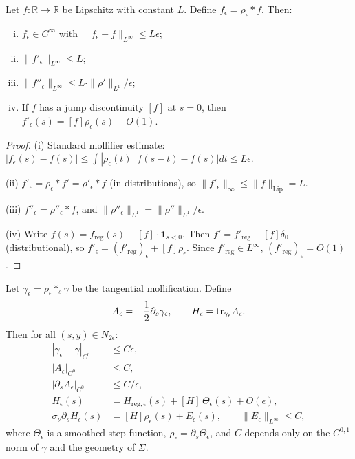 \begin{lemma}
\label{lem:MollificationLipschitz}
Let $f: \mathbb{R} \to \mathbb{R}$ be Lipschitz with constant $L$. Define $f_\epsilon = \rho_\epsilon * f$. Then:
\begin{enumerate}[(i)]
\item $f_\epsilon \in C^\infty$ with $\|f_\epsilon - f\|_{L^\infty} \le L\epsilon$;
\item $\|f'_\epsilon\|_{L^\infty} \le L$;
\item $\|f''_\epsilon\|_{L^\infty} \le L \cdot \|\rho'\|_{L^1} / \epsilon$;
\item If $f$ has a jump discontinuity $[f]$ at $s = 0$, then $f'_\epsilon(s) = [f] \rho_\epsilon(s) + O(1)$.
\end{enumerate}
\end{lemma}

\begin{proof}
(i) Standard mollifier estimate: $|f_\epsilon(s) - f(s)| \le \int |\rho_\epsilon(t)| |f(s-t) - f(s)| dt \le L\epsilon$.

(ii) $f'_\epsilon = \rho_\epsilon * f' = \rho'_\epsilon * f$ (in distributions), so $\|f'_\epsilon\|_\infty \le \|f\|_{\mathrm{Lip}} = L$.

(iii) $f''_\epsilon = \rho''_\epsilon * f$, and $\|\rho''_\epsilon\|_{L^1} = \|\rho''\|_{L^1} / \epsilon$.

(iv) Write $f(s) = f_{\mathrm{reg}}(s) + [f] \cdot \mathbf{1}_{s < 0}$. Then $f' = f'_{\mathrm{reg}} + [f] \delta_0$ (distributional), so
$f'_\epsilon = (f'_{\mathrm{reg}})_\epsilon + [f] \rho_\epsilon$. Since $f'_{\mathrm{reg}} \in L^\infty$, $(f'_{\mathrm{reg}})_\epsilon = O(1)$.
\end{proof}

\begin{proposition}
\label{prop:MollifiedGeometry}
Let $\gamma_\epsilon = \rho_\epsilon *_s \gamma$ be the tangential mollification. Define
\[
A_\epsilon = -\frac{1}{2} \partial_s \gamma_\epsilon, \qquad H_\epsilon = \mathrm{tr}_{\gamma_\epsilon} A_\epsilon.
\]
Then for all $(s, y) \in N_{2\epsilon}$:
\begin{align}
|\gamma_\epsilon - \gamma|_{C^0} &\le C \epsilon, \label{eq:MollGamma0} \\
|A_\epsilon|_{C^0} &\le C, \label{eq:MollA0} \\
|\partial_s A_\epsilon|_{C^0} &\le C / \epsilon, \label{eq:MollA1} \\
H_\epsilon(s) &= H_{\mathrm{reg},\epsilon}(s) + [H]\,\Theta_\epsilon(s) + O(\epsilon), \label{eq:MollH} \\
\sigma_\nu\partial_s H_\epsilon(s) &= [H]\rho_\epsilon(s) + E_\epsilon(s), \qquad \|E_\epsilon\|_{L^\infty}\le C, \label{eq:MollDH}
\end{align}
where \(\Theta_\epsilon\) is a smoothed step function, \(\rho_\epsilon=\partial_s\Theta_\epsilon\), and $C$ depends only on the $C^{0,1}$ norm of $\gamma$ and the geometry of $\Sigma$.
\end{proposition}

